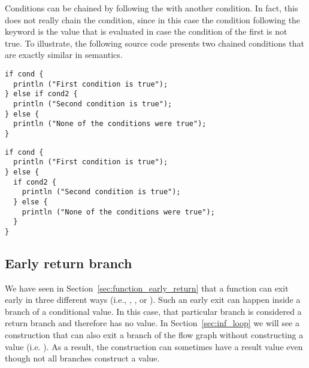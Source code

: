 Conditions can be chained by following the  with another
 condition. In fact, this does not really chain the condition, since
in this case the  condition following the  keyword is
the value that is evaluated in case the condition of the first  is
not true. To illustrate, the following source code presents two chained
 conditions that are exactly similar in semantics.


\begin{minipage}[t][][t]{0.47\linewidth}
\begin{lstlisting}[style=coloredverbatim, escapechar=@, caption=Using a \token{if} as the value of the \token{else} branch]
if cond {
  println ("First condition is true");
} else if cond2 {
  println ("Second condition is true");
} else {
  println ("None of the conditions were true");
}
\end{lstlisting}
\end{minipage}\hspace{10pt}%
\begin{minipage}[t][][t]{0.47\linewidth}
  \begin{lstlisting}[style=coloredverbatim, escapechar=@, caption=Using a block as the value of the \token{else} branch]
if cond {
  println ("First condition is true");
} else {
  if cond2 {
    println ("Second condition is true");
  } else {
    println ("None of the conditions were true");
  }
}
  \end{lstlisting}
\end{minipage}
\vspace{-10pt}%

\subsection{Early return branch}

We have seen in Section~\ref{sec:function_early_return} that a function can exit
early in three different ways (i.e., , , or
). Such an early exit can happen inside a branch of a conditional
value. In this case, that particular branch is considered a return branch and
therefore has no value. In Section~\ref{sec:inf_loop} we will see a construction
that can also exit a branch of the flow graph without constructing a value (i.e.
). As a result, the  construction can sometimes have a
result value even though not all branches construct a value.


